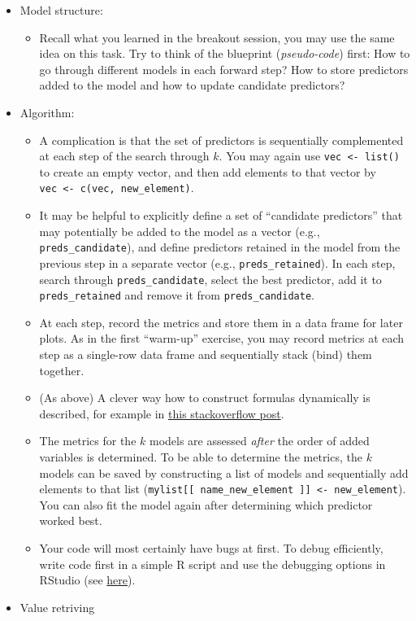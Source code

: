 \documentclass[
]{book}
\providecommand{\tightlist}{%
  \setlength{\itemsep}{0pt}\setlength{\parskip}{0pt}}
\begin{document}
\begin{itemize}
\item
  Model structure:

  \begin{itemize}
  \tightlist
  \item
    Recall what you learned in the breakout session, you may use the same idea on this task. Try to think of the blueprint (\emph{pseudo-code}) first: How to go through different models in each forward step? How to store predictors added to the model and how to update candidate predictors?
  \end{itemize}
\item
  Algorithm:

  \begin{itemize}
  \item
    A complication is that the set of predictors is sequentially complemented at each step of the search through \(k\). You may again use \texttt{vec\ \textless{}-\ list()} to create an empty vector, and then add elements to that vector by \texttt{vec\ \textless{}-\ c(vec,\ new\_element)}.
  \item
    It may be helpful to explicitly define a set of ``candidate predictors'' that may potentially be added to the model as a vector (e.g., \texttt{preds\_candidate}), and define predictors retained in the model from the previous step in a separate vector (e.g., \texttt{preds\_retained}). In each step, search through \texttt{preds\_candidate}, select the best predictor, add it to \texttt{preds\_retained} and remove it from \texttt{preds\_candidate}.
  \item
    At each step, record the metrics and store them in a data frame for later plots. As in the first ``warm-up'' exercise, you may record metrics at each step as a single-row data frame and sequentially stack (bind) them together.
  \item
    (As above) A clever way how to construct formulas dynamically is described, for example in \href{https://stackoverflow.com/questions/4951442/formula-with-dynamic-number-of-variables}{this stackoverflow post}.
  \item
    The metrics for the \(k\) models are assessed \emph{after} the order of added variables is determined. To be able to determine the metrics, the \(k\) models can be saved by constructing a list of models and sequentially add elements to that list (\texttt{mylist{[}{[}\ name\_new\_element\ {]}{]}\ \textless{}-\ new\_element}). You can also fit the model again after determining which predictor worked best.
  \item
    Your code will most certainly have bugs at first. To debug efficiently, write code first in a simple R script and use the debugging options in RStudio (see \href{https://support.rstudio.com/hc/en-us/articles/205612627-Debugging-with-RStudio}{here}).
  \end{itemize}
\item
  Value retriving


\end{itemize}
\end{document}
